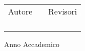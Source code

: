 \thispagestyle{empty}
\begin{center}
	\Logo

	\vspace{2cm}
	\LARGE{\Department\\}

	\vspace{1cm}
	\Large{\Faculty}

	\vspace{2cm}
	\Large\textsc{\What\\}
	\vspace{.3cm}
	{\Huge\textsc{\Subject}\\}
	\vspace{.2cm}
	{\Large\emph{\Subtitle}}

	\vfill
	\begin{tabularx}{\textwidth}{ c X c }
		{\LARGE Autore}	&	& {\LARGE Revisori} \\
		\cmidrule(lr){1-1}\cmidrule(lr){3-3}
		\Author	&	& \firstReviserName \\
				&	& \secondReviserName \\
				&	& \thirdReviserName \\
				&	& \fourthReviserName \\
	\end{tabularx}

	\vfill
	\Large{Anno Accademico \academicYear}
\end{center}
